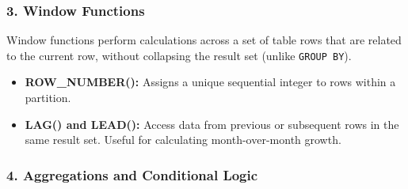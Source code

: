 \subsubsection{3. Window Functions}\label{window-functions-1}

Window functions perform calculations across a set of table rows that
are related to the current row, without collapsing the result set
(unlike \texttt{GROUP\ BY}).

\begin{itemize}
\item
  \textbf{ROW\_NUMBER():} Assigns a unique sequential integer to rows
  within a partition.

\begin{Shaded}
\begin{Highlighting}[]
    \NormalTok{() }\NormalTok{(}  \NormalTok{) }
\end{Highlighting}
\end{Shaded}
\item
  \textbf{LAG() and LEAD():} Access data from previous or subsequent
  rows in the same result set. Useful for calculating month-over-month
  growth.

\begin{Shaded}
\begin{Highlighting}[]
    \NormalTok{) }\NormalTok{(} 
\OperatorTok{{-}} \NormalTok{) }\NormalTok{(} 
\end{Highlighting}
\end{Shaded}
\end{itemize}

\subsubsection{4. Aggregations and Conditional
Logic}\label{aggregations-and-conditional-logic}

